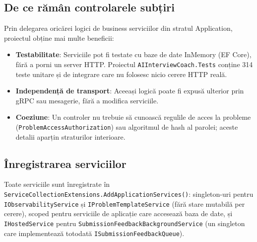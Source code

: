 \subsection{De ce rămân controlarele subțiri}

Prin delegarea oricărei logici de business serviciilor din stratul Application,
proiectul obține mai multe beneficii:

\begin{itemize}
  \item \textbf{Testabilitate}: Serviciile pot fi testate cu baze de date
        InMemory (EF Core), fără a porni un server HTTP.
        Proiectul \texttt{AIInterviewCoach.Tests} conține 314 teste unitare
        și de integrare care nu folosesc nicio cerere HTTP reală.
  \item \textbf{Independență de transport}: Aceeași logică poate fi expusă
        ulterior prin gRPC sau mesagerie, fără a modifica serviciile.
  \item \textbf{Coeziune}: Un controler nu trebuie să cunoască regulile de
        acces la probleme (\texttt{ProblemAccessAuthorization}) sau
        algoritmul de hash al parolei; aceste detalii aparțin straturilor
        interioare.
\end{itemize}

\subsection{Înregistrarea serviciilor}

Toate serviciile sunt înregistrate în
\texttt{ServiceCollectionExtensions.AddApplicationServices()}:
singleton-uri pentru \texttt{IObservabilityService} și
\texttt{IProblemTemplateService} (fără stare mutabilă per cerere),
scoped pentru serviciile de aplicație care accesează baza de date,
și \texttt{IHostedService} pentru \texttt{SubmissionFeedbackBackgroundService}
(un singleton care implementează totodată \texttt{ISubmissionFeedbackQueue}).
